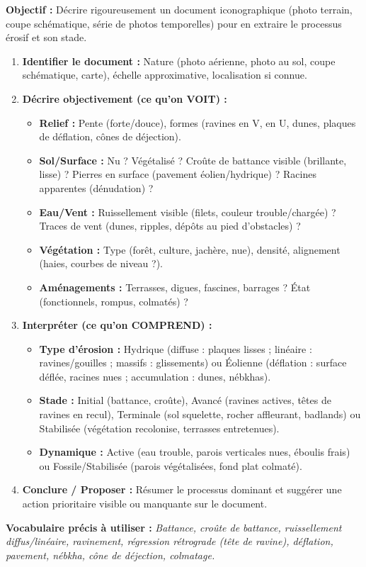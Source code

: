 \documentclass[11pt]{article}
\begin{document}
\begin{methode}
    \textbf{Objectif :} Décrire rigoureusement un document iconographique (photo terrain, coupe schématique, série de photos temporelles) pour en extraire le processus érosif et son stade.
    \begin{enumerate}
        \item \textbf{Identifier le document :} Nature (photo aérienne, photo au sol, coupe schématique, carte), échelle approximative, localisation si connue.
        \item \textbf{Décrire objectivement (ce qu'on VOIT) :}
        \begin{itemize}
            \item \textbf{Relief :} Pente (forte/douce), formes (ravines en V, en U, dunes, plaques de déflation, cônes de déjection).
            \item \textbf{Sol/Surface :} Nu ? Végétalisé ? Croûte de battance visible (brillante, lisse) ? Pierres en surface (pavement éolien/hydrique) ? Racines apparentes (dénudation) ?
            \item \textbf{Eau/Vent :} Ruissellement visible (filets, couleur trouble/chargée) ? Traces de vent (dunes, ripples, dépôts au pied d'obstacles) ?
            \item \textbf{Végétation :} Type (forêt, culture, jachère, nue), densité, alignement (haies, courbes de niveau ?).
            \item \textbf{Aménagements :} Terrasses, digues, fascines, barrages ? État (fonctionnels, rompus, colmatés) ?
        \end{itemize}
        \item \textbf{Interpréter (ce qu'on COMPREND) :}
        \begin{itemize}
            \item \textbf{Type d'érosion :} Hydrique (diffuse : plaques lisses ; linéaire : ravines/gouilles ; massifs : glissements) ou Éolienne (déflation : surface déflée, racines nues ; accumulation : dunes, nébkhas).
            \item \textbf{Stade :} Initial (battance, croûte), Avancé (ravines actives, têtes de ravines en recul), Terminale (sol squelette, rocher affleurant, badlands) ou Stabilisée (végétation recolonise, terrasses entretenues).
            \item \textbf{Dynamique :} Active (eau trouble, parois verticales nues, éboulis frais) ou Fossile/Stabilisée (parois végétalisées, fond plat colmaté).
        \end{itemize}
        \item \textbf{Conclure / Proposer :} Résumer le processus dominant et suggérer une action prioritaire visible ou manquante sur le document.
    \end{enumerate}
    \textbf{Vocabulaire précis à utiliser :} \emph{Battance, croûte de battance, ruissellement diffus/linéaire, ravinement, régression rétrograde (tête de ravine), déflation, pavement, nébkha, cône de déjection, colmatage.}
\end{methode}
\end{document}
